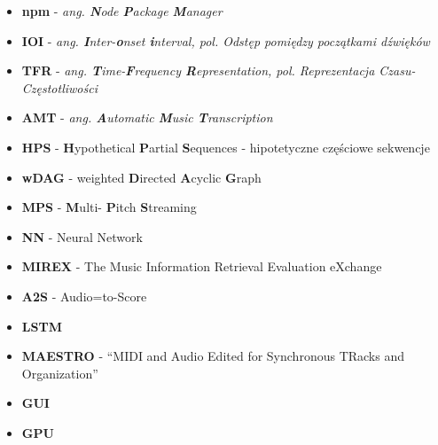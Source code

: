 \documentclass[12pt,a4paper,twoside]{mwart}
\begin{document}
\begin{itemize}
  \item \textbf{npm} - \textit{ang. \textbf{N}ode \textbf{P}ackage \textbf{M}anager}
  \item \textbf{IOI} - \textit{ang. \textbf{I}nter-\textbf{o}nset \textbf{i}nterval, pol. Odstęp pomiędzy początkami dźwięków}
  \item \textbf{TFR} - \textit{ang. \textbf{T}ime-\textbf{F}requency \textbf{R}epresentation, pol. Reprezentacja Czasu-Częstotliwości}
  \item \textbf{AMT} - \textit{ang. \textbf{A}utomatic \textbf{M}usic \textbf{T}ranscription}
  \item \textbf{HPS} - \textbf{H}ypothetical \textbf{P}artial \textbf{S}equences - hipotetyczne częściowe sekwencje
  \item \textbf{wDAG} - weighted \textbf{D}irected \textbf{A}cyclic \textbf{G}raph
  \item \textbf{MPS} - \textbf{M}ulti- \textbf{P}itch \textbf{S}treaming
  \item \textbf{NN} - Neural Network
  \item \textbf{MIREX} - The Music Information Retrieval Evaluation eXchange
  \item \textbf{A2S} - Audio=to-Score
  \item \textbf{LSTM}
  \item \textbf{MAESTRO} - “MIDI and Audio Edited for Synchronous TRacks and Organization”
  \item \textbf{GUI}
  \item \textbf{GPU}
\end{itemize}
\newpage

\printbibliography
\end{document}

